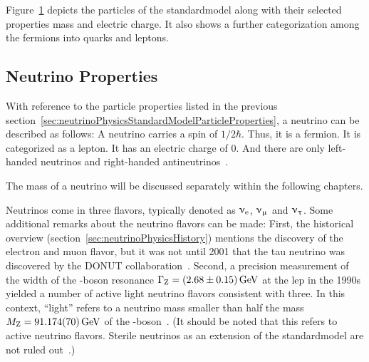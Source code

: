 Figure~\ref{fig:standardmodel} depicts the particles of the \gls{standardmodel} along with their selected properties mass and electric charge. It also shows a further categorization among the fermions into quarks and leptons.
\FloatBarrier
\begin{figure}[t]
	\begin{center}
		\def\svgwidth{\linewidth}
	\end{center}
	\label{fig:standardmodel}
\end{figure}

\subsection{Neutrino Properties}
\label{sec:neutrinoPhysicsStandardModelNeutrinos}
With reference to the particle properties listed in the previous section~\ref{sec:neutrinoPhysicsStandardModelParticleProperties}, a neutrino can be described as follows: A neutrino carries a spin of $1/2 \hbar$. Thus, it is a fermion. It is categorized as a lepton. It has an electric charge of 0. And there are only left-handed neutrinos and right-handed antineutrinos~\cite{Wouter2019}. 

The mass of a neutrino will be discussed separately within the following chapters. 

Neutrinos come in three flavors, typically denoted as $\upnu_\mathrm{e}$, $\upnu_\upmu$ and $\upnu_\uptau$. Some additional remarks about the neutrino flavors can be made: First, the historical overview (section~\ref{sec:neutrinoPhysicsHistory}) mentions the discovery of the electron and muon flavor, but it was not until 2001 that the tau neutrino was discovered by the DONUT collaboration~\cite{Kodama2000}. Second, a precision measurement of the width of the -boson resonance $\Gamma_\mathrm{Z}=\SI[separate-uncertainty=true]{2.68\pm0.15}{GeV}$ at the \gls{lep} in the 1990s yielded a number of active light neutrino flavors consistent with three. In this context, ``light'' refers to a neutrino mass smaller than half the mass $M_\mathrm{Z}=\SI{91.174\pm0.070}{GeV}$ of the -boson~\cite{NumberOfNeutrinos}. (It should be noted that this refers to active neutrino flavors. Sterile neutrinos as an extension of the \gls{standardmodel} are not ruled out~\cite{Otten:2008zz}.)

